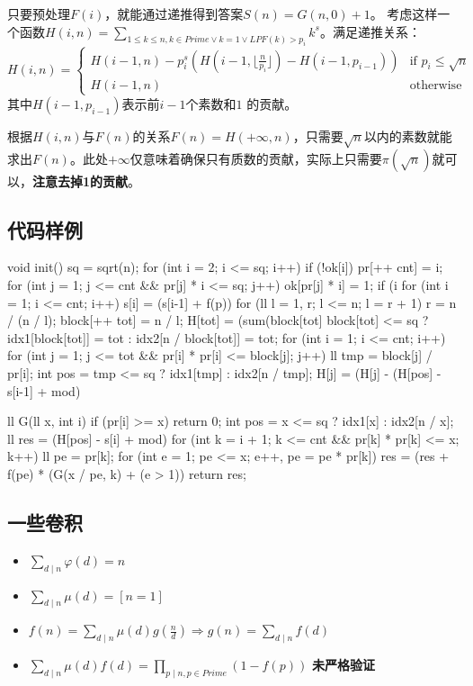 只要预处理$F(i)$，就能通过递推得到答案$S(n)=G(n,0)+1$。
考虑这样一个函数$H(i,n)=\sum_{1\leq k\leq n, k\in Prime \lor k=1 \lor LPF(k)>p_i}{k^s}$。满足递推关系：
\[
  H(i,n)=
  \begin{cases}
    H(i-1,n)-p_i^s\left(H(i-1,\lfloor\frac{n}{p_i}\rfloor)-H(i-1,p_{i-1})\right) & \textrm{if } p_i\leq\sqrt{n}  \\
    H(i-1,n)		& \textrm{otherwise}
  \end{cases}
\]
其中$H(i-1,p_{i-1})$表示前$i-1$个素数和$1$ 的贡献。
\vspace{0.5cm}

根据$H(i,n)$与$F(n)$的关系$F(n)=H(+\infty,n)$，只需要$\sqrt{n}$以内的素数就能求出$F(n)$。此处$+\infty$仅意味着确保只有质数的贡献，实际上只需要$\pi(\sqrt n)$就可以，\textbf{注意去掉1的贡献}。

\subsection{代码样例}

\begin{cpplist}
void init() {
  sq = sqrt(n);
  for (int i = 2; i <= sq; i++) {
    if (!ok[i]) pr[++ cnt] = i;
    for (int j = 1; j <= cnt && pr[j] * i <= sq; j++) {
      ok[pr[j] * i] = 1;
      if (i %
    }
  }
  for (int i = 1; i <= cnt; i++) s[i] = (s[i-1] + f(p)) %
  for (ll l = 1, r; l <= n; l = r + 1) {
    r = n / (n / l); block[++ tot] = n / l;
    H[tot] = (sum(block[tot] %
    block[tot] <= sq 
      ? idx1[block[tot]] = tot 
      : idx2[n / block[tot]] = tot;
  }
  for (int i = 1; i <= cnt; i++) {
    for (int j = 1; j <= tot && pr[i] * pr[i] <= block[j]; j++) {
      ll tmp = block[j] / pr[i];
      int pos = tmp <= sq ? idx1[tmp] : idx2[n / tmp];
      H[j] = (H[j] - (H[pos] - s[i-1] + mod) %
    }
  }
}

ll G(ll x, int i) {
  if (pr[i] >= x) return 0;
  int pos = x <= sq ? idx1[x] : idx2[n / x];
  ll res = (H[pos] - s[i] + mod) %
  for (int k = i + 1; k <= cnt && pr[k] * pr[k] <= x; k++) {
    ll pe = pr[k];
    for (int e = 1; pe <= x; e++, pe = pe * pr[k]) {
      res = (res + f(pe) * (G(x / pe, k) + (e > 1)) %
    }
  } return res;
}
\end{cpplist}

\subsection{一些卷积}

\begin{itemize}\setlength{\itemsep}{-0.1cm}
  \item $\sum_{d\mid n}\varphi(d)=n$
  \item $\sum_{d\mid n}\mu(d)=[n=1]$
  \item $f(n)=\sum_{d\mid n}\mu(d)g(\frac{n}{d})\Rightarrow g(n)=\sum_{d\mid n}f(d)$
  \item $\sum_{d\mid n}\mu(d)f(d) = \prod_{p\mid n,p\in Prime}\left(1-f(p)\right)$ \textbf{未严格验证}
\end{itemize}
